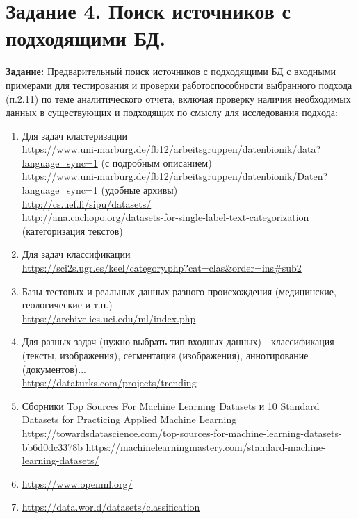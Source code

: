 \documentclass[a4paper, 12pt]{report}		%
\begin{document}
\chapter*{Задание 4. Поиск источников с подходящими БД.}

\textbf{Задание:} Предварительный поиск источников с подходящими БД с входными примерами для тестирования и проверки работоспособности выбранного подхода (п.2.11) по теме аналитического отчета, включая проверку наличия необходимых данных в существующих и подходящих по смыслу для исследования подхода:

\begin{enumerate}
\item{ Для задач кластеризации\\
\url{https://www.uni-marburg.de/fb12/arbeitsgruppen/datenbionik/data?language_sync=1} (с подробным описанием)\\
\url{https://www.uni-marburg.de/fb12/arbeitsgruppen/datenbionik/Daten?language_sync=1} (удобные архивы)\\
\url{http://cs.uef.fi/sipu/datasets/}\\
\url{http://ana.cachopo.org/datasets-for-single-label-text-categorization} (категоризация текстов)
}
\item{ Для задач классификации\\
\url{https://sci2s.ugr.es/keel/category.php?cat=clas&order=ins#sub2}
}
\item{ Базы тестовых и реальных данных разного происхождения (медицинские, геологические и т.п.)\\
\url{https://archive.ics.uci.edu/ml/index.php}
}
\item{ Для разных задач (нужно выбрать тип входных данных) - классификация (тексты, изображения), сегментация (изображения), аннотирование (документов)...\\
\url{https://dataturks.com/projects/trending}
}
\item{Сборники Top Sources For Machine Learning Datasets и 10 Standard Datasets for Practicing Applied Machine Learning\\
\url{https://towardsdatascience.com/top-sources-for-machine-learning-datasets-bb6d0dc3378b}
\url{https://machinelearningmastery.com/standard-machine-learning-datasets/}
}
\item{\url{https://www.openml.org/}}
\item{\url{https://data.world/datasets/classification}}

\end{enumerate}
\end{document}
